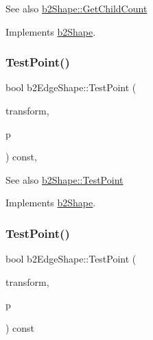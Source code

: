 \begin{DoxySeeAlso}{See also}
\hyperlink{classb2Shape_a05a3c445017d96df9238ceefe6ce37ab}{b2\+Shape\+::\+Get\+Child\+Count} 
\end{DoxySeeAlso}


Implements \hyperlink{classb2Shape_a05a3c445017d96df9238ceefe6ce37ab}{b2\+Shape}.

\mbox{\label{classb2EdgeShape_a15151673cf9ad585779c70363425f470}} 
\subsubsection{\texorpdfstring{Test\+Point()}{TestPoint()}\hspace{0.1cm}{\footnotesize\ttfamily [1/2]}}
{\footnotesize\ttfamily bool b2\+Edge\+Shape\+::\+Test\+Point (\begin{DoxyParamCaption}\item[{const \hyperlink{structb2Transform}{b2\+Transform} \&}]{transform,  }\item[{const \hyperlink{structb2Vec2}{b2\+Vec2} \&}]{p }\end{DoxyParamCaption}) const\hspace{0.3cm}{\ttfamily [override]}, {\ttfamily [virtual]}}

\begin{DoxySeeAlso}{See also}
\hyperlink{classb2Shape_a6ac968e403e2d93e8ae46d728a2e50fa}{b2\+Shape\+::\+Test\+Point} 
\end{DoxySeeAlso}


Implements \hyperlink{classb2Shape_a6ac968e403e2d93e8ae46d728a2e50fa}{b2\+Shape}.

\mbox{\label{classb2EdgeShape_a23a429c4cf919ff5140ca28b53db43fe}} 
\subsubsection{\texorpdfstring{Test\+Point()}{TestPoint()}\hspace{0.1cm}{\footnotesize\ttfamily [2/2]}}
{\footnotesize\ttfamily bool b2\+Edge\+Shape\+::\+Test\+Point (\begin{DoxyParamCaption}\item[{const \hyperlink{structb2Transform}{b2\+Transform} \&}]{transform,  }\item[{const \hyperlink{structb2Vec2}{b2\+Vec2} \&}]{p }\end{DoxyParamCaption}) const\hspace{0.3cm}{\ttfamily [virtual]}}

